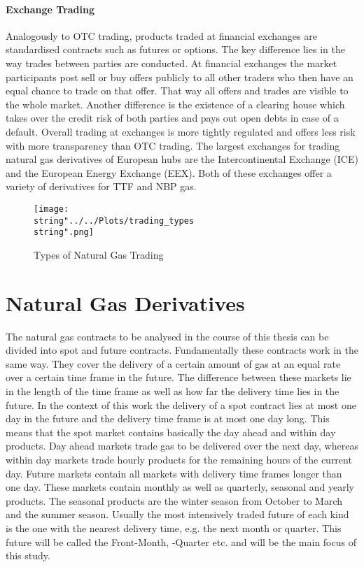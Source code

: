 \paragraph{Exchange Trading}
Analogously to OTC trading, products traded at financial exchanges are standardised contracts such as futures or options. The key difference lies in the way trades between parties are conducted. At financial exchanges the market participants post sell or buy offers publicly to all other traders who then have an equal chance to trade on that offer. That way all offers and trades are visible to the whole market. Another difference is the existence of a clearing house which takes over the credit risk of both parties and pays out open debts in case of a default. Overall trading at exchanges is more tightly regulated and offers less risk with more transparency than OTC trading. The largest exchanges for trading natural gas derivatives of European hubs are the Intercontinental Exchange (ICE) and the European Energy Exchange (EEX). Both of these exchanges offer a variety of derivatives for TTF and NBP gas.

\begin{figure}[H]
  \centering
\texttt{[image: \\string"../../Plots/trading\_types\\string".png]}
  \caption{Types of Natural Gas Trading}\label{fig:trading_types}
\end{figure}

\section{Natural Gas Derivatives}
The natural gas contracts to be analysed in the course of this thesis can be divided into spot and future contracts. Fundamentally these contracts work in the same way. They cover the delivery of a certain amount of gas at an equal rate over a certain time frame in the future. The difference between these markets lie in the length of the time frame as well as how far the delivery time lies in the future. In the context of this work the delivery of a spot contract lies at most one day in the future and the delivery time frame is at most one day long. This means that the spot market contains basically the day ahead and within day products. Day ahead markets trade gas to be delivered over the next day, whereas within day markets trade hourly products for the remaining hours of the current day. Future markets contain all markets with delivery time frames longer than one day. These markets contain monthly as well as quarterly, seasonal and yearly products. The seasonal products are the winter season from October to March and the summer season. Usually the most intensively traded future of each kind is the one with the nearest delivery time, e.g. the next month or quarter. This future will be called the Front-Month, -Quarter etc. and will be the main focus of this study. 

